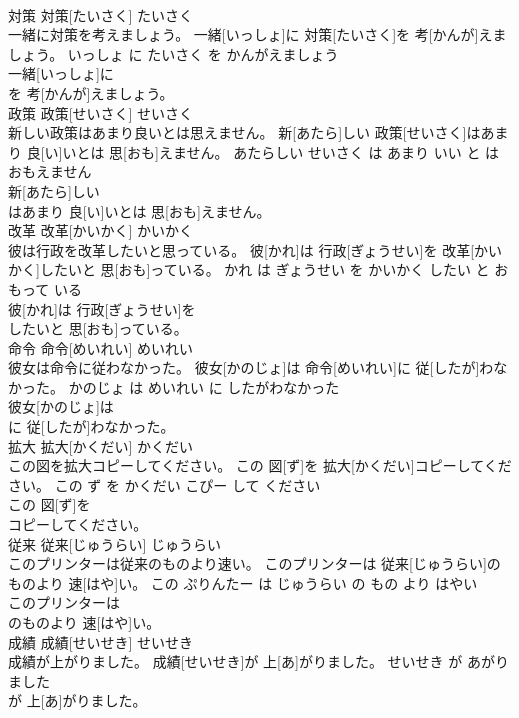 \documentclass[8pt]{extreport}
\begin{document}
\begin{CJK}{UTF8}{min}
\\	対策	対策[たいさく]	たいさく	
\\	一緒に対策を考えましょう。	一緒[いっしょ]に 対策[たいさく]を 考[かんが]えましょう。	いっしょ に たいさく を かんがえましょう	
\\	一緒[いっしょ]に
\\	を 考[かんが]えましょう。			
\\	政策	政策[せいさく]	せいさく	
\\	新しい政策はあまり良いとは思えません。	新[あたら]しい 政策[せいさく]はあまり 良[い]いとは 思[おも]えません。	あたらしい せいさく は あまり いい と は おもえません	
\\	新[あたら]しい
\\	はあまり 良[い]いとは 思[おも]えません。			
\\	改革	改革[かいかく]	かいかく	
\\	彼は行政を改革したいと思っている。	彼[かれ]は 行政[ぎょうせい]を 改革[かいかく]したいと 思[おも]っている。	かれ は ぎょうせい を かいかく したい と おもって いる	
\\	彼[かれ]は 行政[ぎょうせい]を
\\	したいと 思[おも]っている。			
\\	命令	命令[めいれい]	めいれい	
\\	彼女は命令に従わなかった。	彼女[かのじょ]は 命令[めいれい]に 従[したが]わなかった。	かのじょ は めいれい に したがわなかった	
\\	彼女[かのじょ]は
\\	に 従[したが]わなかった。			
\\	拡大	拡大[かくだい]	かくだい	
\\	この図を拡大コピーしてください。	この 図[ず]を 拡大[かくだい]コピーしてください。	この ず を かくだい こぴー して ください	
\\	この 図[ず]を
\\	コピーしてください。			
\\	従来	従来[じゅうらい]	じゅうらい	
\\	このプリンターは従来のものより速い。	このプリンターは 従来[じゅうらい]のものより 速[はや]い。	この ぷりんたー は じゅうらい の もの より はやい	
\\	このプリンターは
\\	のものより 速[はや]い。			
\\	成績	成績[せいせき]	せいせき	
\\	成績が上がりました。	成績[せいせき]が 上[あ]がりました。	せいせき が あがりました	
\\	が 上[あ]がりました。			

\end{CJK}
\end{document}
